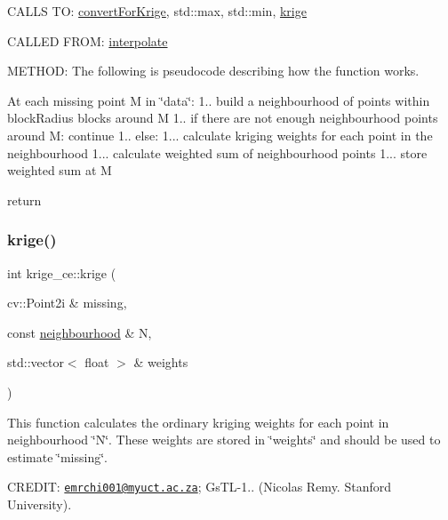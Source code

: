 C\+A\+L\+LS TO\+: \hyperlink{namespacekrige__ce_a861d4c1c299c2a804f97da659a07da9b}{convert\+For\+Krige}, std\+::max, std\+::min, \hyperlink{namespacekrige__ce_a4b3240fe905c7bb2f9b7435eb32c9a22}{krige}

C\+A\+L\+L\+ED F\+R\+OM\+: \hyperlink{namespacekrige__ce_a2baf63b9ce686bca1b18e20e15327b17}{interpolate}

M\+E\+T\+H\+OD\+: The following is pseudocode describing how the function works.
\begin{DoxyEnumerate}
\item At each missing point M in \char`\"{}data\char`\"{}\+: 1.. build a neighbourhood of points within block\+Radius blocks around M 1.. if there are not enough neighbourhood points around M\+: continue 1.. else\+: 1... calculate kriging weights for each point in the neighbourhood 1... calculate weighted sum of neighbourhood points 1... store weighted sum at M
\item return 
\end{DoxyEnumerate}\mbox{\label{namespacekrige__ce_a4b3240fe905c7bb2f9b7435eb32c9a22}} 
\subsubsection{\texorpdfstring{krige()}{krige()}}
{\footnotesize\ttfamily int krige\+\_\+ce\+::krige (\begin{DoxyParamCaption}\item[{cv\+::\+Point2i \&}]{missing,  }\item[{const \hyperlink{classkrige__ce_1_1neighbourhood}{neighbourhood} \&}]{N,  }\item[{std\+::vector$<$ float $>$ \&}]{weights }\end{DoxyParamCaption})}



This function calculates the ordinary kriging weights for each point in neighbourhood \char`\"{}\+N\char`\"{}. These weights are stored in \char`\"{}weights\char`\"{} and should be used to estimate \char`\"{}missing\char`\"{}. 

C\+R\+E\+D\+IT\+: \href{mailto:emrchi001@myuct.ac.za}{\tt emrchi001@myuct.\+ac.\+za}; Gs\+T\+L-\/1.. (Nicolas Remy. Stanford University).


